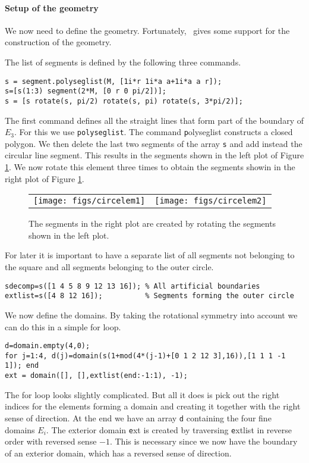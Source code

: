\paragraph{Setup of the geometry}

We now need to define the geometry. Fortunately,
\mpspack\ gives some support for the construction of the geometry.

The list of segments is defined by the following three commands.

\begin{verbatim}
s = segment.polyseglist(M, [1i*r 1i*a a+1i*a a r]);
s=[s(1:3) segment(2*M, [0 r 0 pi/2])];
s = [s rotate(s, pi/2) rotate(s, pi) rotate(s, 3*pi/2)];
\end{verbatim}
The first command defines all the straight lines that form part of the
boundary of $E_3$. For this we use {\texttt{polyseglist}}. The command
{\texttt polyseglist} constructs a closed polygon. We then delete the
last two segments of the array {\texttt s} and add instead the
circular line segment. This results in the segments shown in the left
plot of Figure \ref{fig:circelem}. We now rotate this element three times to
obtain the segments showin in the right plot of Figure \ref{fig:circelem}.
\begin{figure}
\begin{tabular}{cc}
\texttt{[image: figs/circelem1]} &
\texttt{[image: figs/circelem2]}
\end{tabular}
\caption{The segments in the right plot are created by rotating the segments
  shown in the left plot.}
\label{fig:circelem}
\end{figure}

For later it is important to have a separate list of all segments not
belonging to the square and all segments belonging to the outer
circle.

\begin{verbatim}
sdecomp=s([1 4 5 8 9 12 13 16]); % All artificial boundaries
extlist=s([4 8 12 16]);          % Segments forming the outer circle
\end{verbatim}

We now define the domains. By taking the rotational symmetry into
account we can do this in a simple for loop.

\begin{verbatim}
d=domain.empty(4,0);
for j=1:4, d(j)=domain(s(1+mod(4*(j-1)+[0 1 2 12 3],16)),[1 1 1 -1 1]); end
ext = domain([], [],extlist(end:-1:1), -1); 
\end{verbatim}
The for loop looks slightly complicated. But all it does is pick out
the right indices for the elements forming a domain and creating it
together with the right sense of direction. At the end we have an
array {\texttt d} containing the four fine domains $E_i$. The exterior
domain {\texttt ext} is created by traversing {\texttt extlist} in
reverse order with reversed sense $-1$. This is necessary since we now
have the boundary of an exterior domain, which has a reversed sense of
direction.

